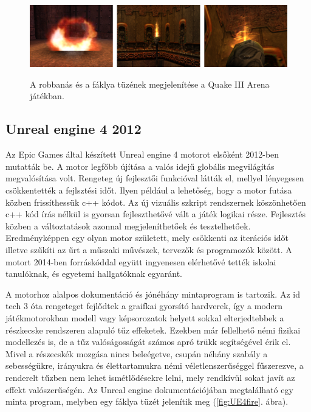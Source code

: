 \begin{figure}[h]
 \caption{A robbanás és a fáklya tüzének megjelenítése a Quake III Arena játékban.}
 \includegraphics[width=\textwidth]{kepek/quake3fire.png}
 \label{fig:quake3fire}
\end{figure}



\subsection{Unreal engine 4 2012}
Az Epic Games által készített Unreal engine 4 motorot elsőként 2012-ben mutatták be. A motor legfőbb újítása a valós idejű globális megvilágítás megvalósítása volt. Rengeteg új fejlesztői funkcióval látták el, mellyel lényegesen csökkentették a fejlsztési időt. Ilyen például a lehetőség, hogy a motor futása közben frissíthessük c++ kódot. Az új vizuális szkript rendszernek köszönhetően c++ kód írás nélkül is gyorsan fejleszthetővé vált a játék logikai része. Fejlesztés közben a változtatások azonnal megjeleníthetőek és tesztelhetőek. Eredményképpen egy olyan motor született, mely csökkenti az iterációs időt illetve szűkíti az űrt a műszaki művészek, tervezők és programozók között. A motort 2014-ben forráskóddal együtt ingyenesen elérhetővé tették iskolai tanulóknak, és egyetemi hallgatóknak egyaránt. \cite{wikUE4}

A motorhoz alalpos dokumentáció és jónéhány mintaprogram is tartozik. Az id tech 3 óta rengeteget fejlődtek a graifkai gyorsító hardverek, így a modern játékmotorokban modell vagy képsorozatok helyett sokkal elterjedtebbek a részkecske rendszeren alapuló tűz effeketek. Ezekben már fellelhető némi fizikai modellezés is, de a tűz valóságosságát számos apró trükk segítségével érik el. Mivel a részecskék mozgása nincs beleégetve, csupán néhány szabály a sebességükre, irányukra és élettartamukra némi véletlenszerűséggel fűszerezve, a renderelt tűzben nem lehet ismétlődésekre lelni, mely rendkívül sokat javít az effekt valószerűségén. Az Unreal engine dokumentációjában megtalálható egy minta program, melyben egy fáklya tüzét jelenítik meg (\ref{fig:UE4fire}. ábra).

